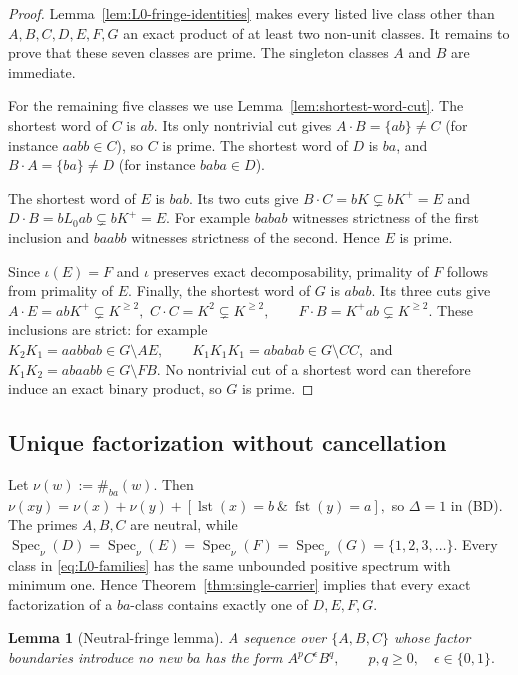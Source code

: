 \documentclass[11pt,a4paper]{article}
\newtheorem{lemma}[theorem]{Lemma}
\newcommand{\Spec}{\operatorname{Spec}}
\newcommand{\fst}{\operatorname{fst}}
\newcommand{\lst}{\operatorname{lst}}
\begin{document}
\begin{proof}
Lemma~\ref{lem:L0-fringe-identities} makes every listed live class
other than $A,B,C,D,E,F,G$ an exact product of at least two non-unit
classes.  It remains to prove that these seven classes are prime.
The singleton classes $A$ and $B$ are immediate.

For the remaining five classes we use Lemma~\ref{lem:shortest-word-cut}.
The shortest word of $C$ is $ab$.  Its only nontrivial cut gives
$A\cdot B=\{ab\}\ne C$ (for instance $aabb\in C$), so $C$ is prime.
The shortest word of $D$ is $ba$, and
$B\cdot A=\{ba\}\ne D$ (for instance $baba\in D$).

The shortest word of $E$ is $bab$.  Its two cuts give
\(B\cdot C=bK\subsetneq bK^+=E\)
and
\(D\cdot B=bL_0ab\subsetneq bK^+=E.\)
For example $babab$ witnesses strictness of the first inclusion and
$baabb$ witnesses strictness of the second.  Hence $E$ is prime.

Since $\iota(E)=F$ and $\iota$ preserves exact decomposability,
primality of $F$ follows from primality of $E$.  Finally, the shortest
word of $G$ is $abab$.  Its three cuts give
\(A\cdot E=abK^+\subsetneq K^{\ge2},\)
\(C\cdot C=K^2\subsetneq K^{\ge2}, \qquad F\cdot B=K^+ab\subsetneq K^{\ge2}.\)
These inclusions are strict: for example
\(K_2K_1=aabbab\in G\setminus A E, \qquad K_1K_1K_1=ababab\in G\setminus C C,\)
and
\(K_1K_2=abaabb\in G\setminus F B.\)
No nontrivial cut of a shortest word can therefore induce an exact
binary product, so $G$ is prime.
\end{proof}

\subsection{Unique factorization without cancellation}

Let
\(\nu(w):=\#_{ba}(w).\)
Then
\(\nu(xy)=\nu(x)+\nu(y)+[\lst(x)=b\ \&\ \fst(y)=a],\)
so $\Delta=1$ in \textup{(BD)}.  The primes $A,B,C$ are neutral, while
\(\Spec_\nu(D)=\Spec_\nu(E)=\Spec_\nu(F)=\Spec_\nu(G) =\{1,2,3,\ldots\}.\)
Every class in \eqref{eq:L0-families} has the same unbounded positive spectrum
with minimum one.  Hence Theorem~\ref{thm:single-carrier} implies that every
exact factorization of a $ba$-class contains exactly one of
$D,E,F,G$.

\begin{lemma}[Neutral-fringe lemma]
\label{lem:L0-neutral-fringe}
A sequence over $\{A,B,C\}$ whose factor boundaries introduce no new
$ba$ has the form
\(A^pC^\epsilon B^q, \qquad p,q\ge0, \quad \epsilon\in\{0,1\}.\)
\end{lemma}
\end{document}
